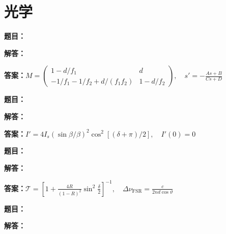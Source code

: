\documentclass[lang=cn,color=blue,11pt]{elegantbook}
\begin{document}
\chapter{光学}

\par
\noindent\textbf{题目：}
\par\noindent\textbf{解答：}
\par\noindent\textbf{答案：}\(\displaystyle M=\begin{pmatrix}1-d/f_1&d\\-1/f_1-1/f_2+d/(f_1f_2)&1-d/f_2\end{pmatrix},\quad s'=-\frac{As+B}{Cs+D}\)\par
\par\smallskip\noindent\hrulefill\par\medskip
{}\par
\noindent\textbf{题目：}
\par\noindent\textbf{解答：}
\par\noindent\textbf{答案：}\(\displaystyle I'=4I_s(\sin\beta/\beta)^2\cos^2[(\delta+\pi)/2],\quad I'(0)=0\)\par
\par\smallskip\noindent\hrulefill\par\medskip
{}\par
\noindent\textbf{题目：}
\par\noindent\textbf{解答：}
\par\noindent\textbf{答案：}\(\displaystyle \mathcal T=\left[1+\frac{4R}{(1-R)^2}\sin^2\frac\delta2\right]^{-1},\quad \Delta\nu_{\mathrm{FSR}}=\frac c{2nd\cos\vartheta}\)\par
\par\smallskip\noindent\hrulefill\par\medskip
{}\par
\noindent\textbf{题目：}
\par\noindent\textbf{解答：}
\end{document}
